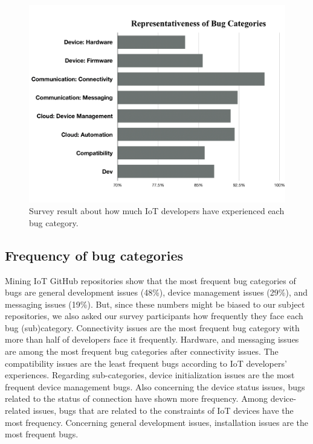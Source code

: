 \begin{figure}%
  \centering
   \includegraphics[width=\linewidth]{imgs/bugRep}
  \caption{Survey result about how much IoT developers have experienced each bug category.}
  \label{fig:bugRep}
\end{figure}

\subsection{Frequency of bug categories}
Mining IoT GitHub repositories show that the most frequent bug categories of bugs are general development issues (48\%), device management issues (29\%), and messaging issues (19\%). But, since these numbers might be biased to our subject repositories, we also asked our survey participants how frequently they face each bug (sub)category. Connectivity issues are the most frequent bug category with more than half of developers face it frequently. Hardware, and messaging issues are among the most frequent bug categories after connectivity issues. 
The compatibility issues are the least frequent bugs according to IoT developers' experiences. Regarding sub-categories, device initialization issues are the most frequent device management bugs. Also concerning the device status issues, bugs related to the status of connection have shown more frequency. Among device-related issues, bugs that are related to the constraints of IoT devices have the most frequency. Concerning general development issues, installation issues are the most frequent bugs. 

